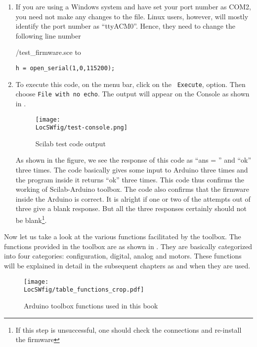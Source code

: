 \begin{enumerate}
      \item If you are using a Windows system and have set your port number
            as COM2, you need not make any changes to the file. Linux users,
            however, will mostly identify the port number as ``ttyACM0''. Hence, 
            they need to change the following line number
            
            {\LocSWchkcode/test_firmware.sce}
            to
            \begin{lstlisting}[style=nonumbers]
  h = open_serial(1,0,115200); 
\end{lstlisting}
            
      \item To execute this code, on the menu bar, click on the {\tt
                        Execute}, option. Then choose {\tt File with no echo}. The output
            will appear on the Console as shown in .
            \begin{figure}
                  \centering
                  \texttt{[image: \\LocSWfig/test-console.png]}
                  \caption{Scilab test code output}
                  \label{test-console}
            \end{figure}
            As shown in the figure, we see the response of this code as ``ans = '' and
            ``ok'' three times.  The
            code basically gives some input to Arduino three times and the
            program inside it returns ``ok'' three times.  This code thus confirms
            the working of Scilab-Arduino toolbox.  The code also confirms
            that the firmware inside the Arduino is correct.  It is alright if
            one or two of the attempts out of three give a blank response.  But
            all the three responses certainly should not be
            blank\footnote{\label{fn:firmware}If this step is unsuccessful,
                  one should check the connections and re-install the firmware}.
\end{enumerate}

Now let us take a look at the various functions facilitated by the
toolbox. The functions provided in the toolbox are as shown in 
. They are basically categorized into four categories:
configuration, digital, analog and motors. These functions will be
explained in detail in the subsequent chapters as and when they are
used.

\begin{figure}
      \centering
      \texttt{[image: \\LocSWfig/table\_functions\_crop.pdf]}
      \caption{Arduino toolbox functions used in this book}
      \label{func}
\end{figure}

